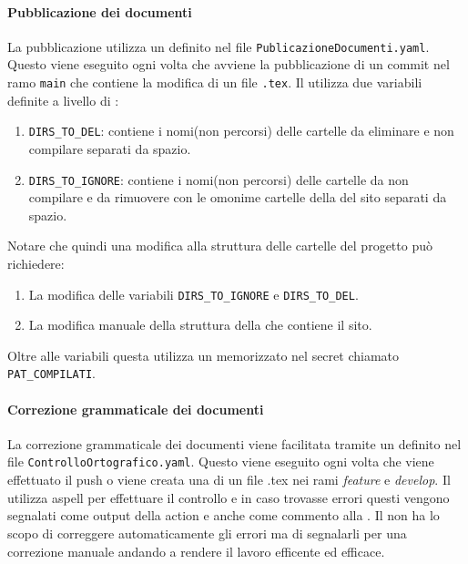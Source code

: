 \paragraph{Pubblicazione dei documenti}
\label{par:pubblicazione_documenti}
La pubblicazione utilizza un  definito nel file \texttt{PublicazioneDocumenti.yaml}.
Questo  viene eseguito ogni volta che avviene la pubblicazione di un commit nel ramo \texttt{main} che contiene la modifica di un file \texttt{.tex}.
Il  utilizza due variabili definite a livello di :
\begin{enumerate}
    \item \texttt{DIRS\_TO\_DEL}: contiene i nomi(non percorsi) delle cartelle da eliminare e non compilare separati da spazio.
    \item \texttt{DIRS\_TO\_IGNORE}: contiene i nomi(non percorsi) delle cartelle da non compilare e da rimuovere con le omonime cartelle della  del sito separati da spazio.
\end{enumerate}
Notare che quindi una modifica alla struttura delle cartelle del progetto può richiedere:
\begin{enumerate}
    \item La modifica delle variabili \texttt{DIRS\_TO\_IGNORE} e \texttt{DIRS\_TO\_DEL}.
    \item La modifica manuale della struttura della  che contiene il sito.
\end{enumerate}
Oltre alle variabili questa  utilizza un \textbf{} memorizzato nel secret chiamato \texttt{PAT\_COMPILATI}.

\paragraph{Correzione grammaticale dei documenti}
\label{par:correzione_grammaticale}
La correzione grammaticale dei documenti viene facilitata tramite un  definito nel file \texttt{ControlloOrtografico.yaml}.
Questo  viene eseguito ogni volta che viene effettuato il push o viene creata una  di un file .tex nei rami \textit{feature} e \textit{develop}.
Il  utilizza aspell per effettuare il controllo e in caso trovasse errori questi vengono segnalati come output della action e anche come commento alla .
Il  non ha lo scopo di correggere automaticamente gli errori ma di segnalarli per una correzione manuale andando a rendere il lavoro efficente ed efficace. 

